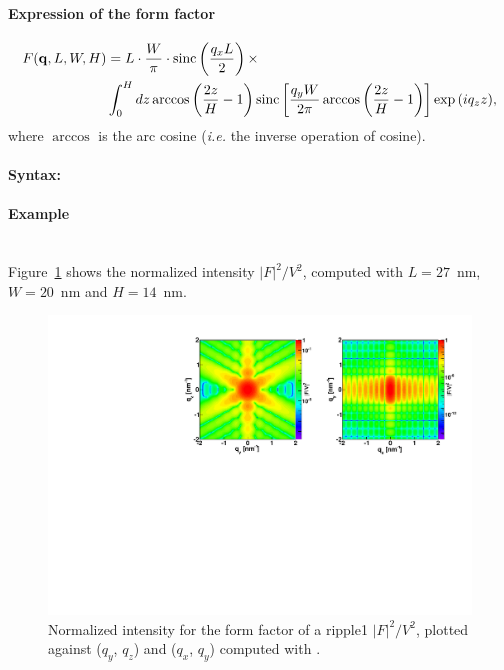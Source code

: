 \paragraph{Expression of the form factor}
\begin{align*}
F(\mathbf{q},L,W,H) &=L \cdot \frac{W}{\pi}\cdot \operatorname{sinc}\left(\frac{q_xL}{2}\right)\times \\ &\int_0^H{dz \arccos\left(\frac{2z}{H}-1\right)\operatorname{sinc}\left[\frac{q_yW}{2\pi}\arccos\left(\frac{2z}{H} - 1\right)\right]\exp\left(iq_zz\right)},
\end{align*}
where $\arccos$ is the  arc cosine (\textit{i.e.} the inverse
operation of cosine).

\paragraph{Syntax:} 

\paragraph{Example}\mbox{}\\
Figure~\ref{fig:FFripple1Ex} shows the normalized intensity
$|F|^2/V^2$, computed with $L=27$~nm, $W=20$~nm and $H=14$~nm.

\begin{figure}[h]
\begin{center}
\includegraphics[width=\textwidth]{Figures/figffripple1}
\end{center}
\caption{Normalized intensity for the form factor of a ripple1
  $|F|^2/V^2$, plotted against ($q_y$, $q_z$) and  ($q_x$, $q_y$)
  computed with .}
\label{fig:FFripple1Ex}
\end{figure}

